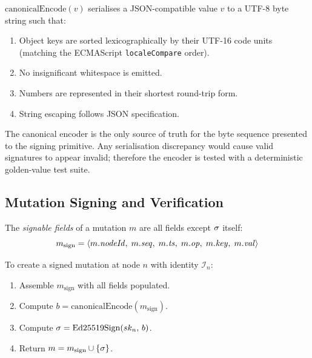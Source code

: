 \begin{definition}
\label{def:canonical}
$\mathrm{canonicalEncode}(v)$ serialises a JSON-compatible value $v$ to a
UTF-8 byte string such that:
\begin{enumerate}[leftmargin=1.5em]
  \item Object keys are sorted lexicographically by their UTF-16 code units
        (matching the ECMAScript \texttt{localeCompare} order).
  \item No insignificant whitespace is emitted.
  \item Numbers are represented in their shortest round-trip form.
  \item String escaping follows JSON specification.
\end{enumerate}
\end{definition}

The canonical encoder is the only source of truth for the byte sequence
presented to the signing primitive. Any serialisation discrepancy would cause
valid signatures to appear invalid; therefore the encoder is tested with a
deterministic golden-value test suite.

\subsection{Mutation Signing and Verification}

\begin{definition}
The \emph{signable fields} of a mutation $m$ are all fields except $\sigma$
itself:
\[
  m_{\text{sign}} =
    \langle m.\mathit{nodeId},\; m.\mathit{seq},\; m.\mathit{ts},\; m.\mathit{op},\; m.\mathit{key},\; m.\mathit{val} \rangle
\]
\end{definition}

\begin{protocol}
To create a signed mutation at node $n$ with identity $\mathcal{I}_n$:
\begin{enumerate}[leftmargin=1.5em]
  \item Assemble $m_{\text{sign}}$ with all fields populated.
  \item Compute $b = \mathrm{canonicalEncode}(m_{\text{sign}})$.
  \item Compute $\sigma = \mathrm{Ed25519Sign}(sk_n,\, b)$.
  \item Return $m = m_{\text{sign}} \cup \{\sigma\}$.
\end{enumerate}
\end{protocol}

